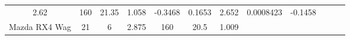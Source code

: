 \documentclass[]{article}
\theoremstyle{definition}
\theoremstyle{definition}
\theoremstyle{definition}
\theoremstyle{remark}
\begin{document}
\begin{longtable}[]{@{}cccccccccccc@{}}
\begin{minipage}[t]{0.04\columnwidth}
2.62\strut
\end{minipage} & \begin{minipage}[t]{0.04\columnwidth}\centering\strut
160\strut
\end{minipage} & \begin{minipage}[t]{0.05\columnwidth}\centering\strut
21.35\strut
\end{minipage} & \begin{minipage}[t]{0.05\columnwidth}\centering\strut
1.058\strut
\end{minipage} & \begin{minipage}[t]{0.05\columnwidth}\centering\strut
-0.3468\strut
\end{minipage} & \begin{minipage}[t]{0.05\columnwidth}\centering\strut
0.1653\strut
\end{minipage} & \begin{minipage}[t]{0.05\columnwidth}\centering\strut
2.652\strut
\end{minipage} & \begin{minipage}[t]{0.06\columnwidth}\centering\strut
0.0008423\strut
\end{minipage} & \begin{minipage}[t]{0.06\columnwidth}\centering\strut
-0.1458\strut
\end{minipage}\tabularnewline
\begin{minipage}[t]{0.11\columnwidth}\centering\strut
Mazda RX4 Wag\strut
\end{minipage} & \begin{minipage}[t]{0.04\columnwidth}\centering\strut
21\strut
\end{minipage} & \begin{minipage}[t]{0.08\columnwidth}\centering\strut
6\strut
\end{minipage} & \begin{minipage}[t]{0.04\columnwidth}\centering\strut
2.875\strut
\end{minipage} & \begin{minipage}[t]{0.04\columnwidth}\centering\strut
160\strut
\end{minipage} & \begin{minipage}[t]{0.05\columnwidth}\centering\strut
20.5\strut
\end{minipage} & \begin{minipage}[t]{0.05\columnwidth}\centering\strut
1.009\strut
\end{minipage} & \begin{minipage}[t]{0.05\columnwidth}\centering\strut

\end{minipage}
\end{longtable}
\end{document}
